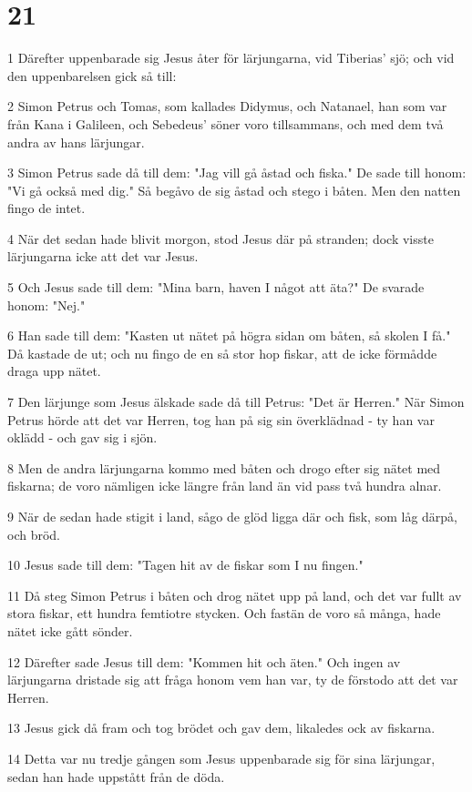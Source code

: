 \chapter{21}

\par 1 Därefter uppenbarade sig Jesus åter för lärjungarna, vid Tiberias' sjö; och vid den uppenbarelsen gick så till:
\par 2 Simon Petrus och Tomas, som kallades Didymus, och Natanael, han som var från Kana i Galileen, och Sebedeus' söner voro tillsammans, och med dem två andra av hans lärjungar.
\par 3 Simon Petrus sade då till dem: "Jag vill gå åstad och fiska." De sade till honom: "Vi gå också med dig." Så begåvo de sig åstad och stego i båten. Men den natten fingo de intet.
\par 4 När det sedan hade blivit morgon, stod Jesus där på stranden; dock visste lärjungarna icke att det var Jesus.
\par 5 Och Jesus sade till dem: "Mina barn, haven I något att äta?" De svarade honom: "Nej."
\par 6 Han sade till dem: "Kasten ut nätet på högra sidan om båten, så skolen I få." Då kastade de ut; och nu fingo de en så stor hop fiskar, att de icke förmådde draga upp nätet.
\par 7 Den lärjunge som Jesus älskade sade då till Petrus: "Det är Herren." När Simon Petrus hörde att det var Herren, tog han på sig sin överklädnad - ty han var oklädd - och gav sig i sjön.
\par 8 Men de andra lärjungarna kommo med båten och drogo efter sig nätet med fiskarna; de voro nämligen icke längre från land än vid pass två hundra alnar.
\par 9 När de sedan hade stigit i land, sågo de glöd ligga där och fisk, som låg därpå, och bröd.
\par 10 Jesus sade till dem: "Tagen hit av de fiskar som I nu fingen."
\par 11 Då steg Simon Petrus i båten och drog nätet upp på land, och det var fullt av stora fiskar, ett hundra femtiotre stycken. Och fastän de voro så många, hade nätet icke gått sönder.
\par 12 Därefter sade Jesus till dem: "Kommen hit och äten." Och ingen av lärjungarna dristade sig att fråga honom vem han var, ty de förstodo att det var Herren.
\par 13 Jesus gick då fram och tog brödet och gav dem, likaledes ock av fiskarna.
\par 14 Detta var nu tredje gången som Jesus uppenbarade sig för sina lärjungar, sedan han hade uppstått från de döda.
